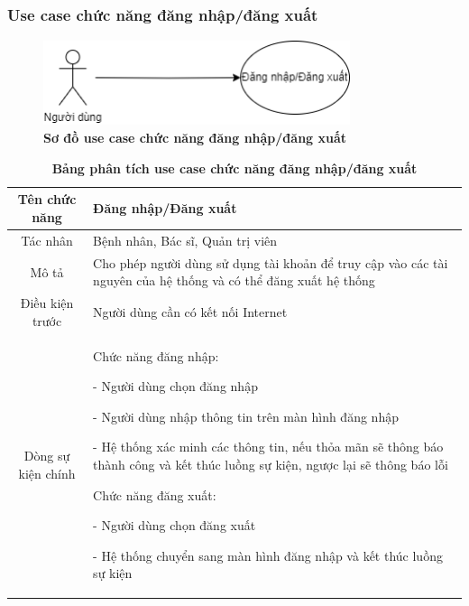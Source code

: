 \subsubsection{Use case chức năng đăng nhập/đăng xuất}
  \begin{figure}[H]
    \centering
    \includegraphics[width=9cm,height=2.5cm]{Images/use_case/use_case_login.png}
    \caption[Sơ đồ use case chức năng đăng nhập/đăng xuất]{\bfseries \fontsize{12pt}{0pt}
    \selectfont Sơ đồ use case chức năng đăng nhập/đăng xuất}
    \label{use_case_login_logout} %
  \end{figure}

  \begin{table}[H]
    \caption{\bfseries \fontsize{12pt}{0pt}\selectfont Bảng phân tích use case chức năng đăng nhập/đăng xuất}
    \centering
    \begin{tabularx}{0.9\textwidth}{|c|X|}
      \hline
      \textbf{Tên chức năng} & \textbf{Đăng nhập/Đăng xuất} \\
      \hline
      Tác nhân & Bệnh nhân, Bác sĩ, Quản trị viên \\
      \hline
      Mô tả & Cho phép người dùng sử dụng tài khoản để truy cập vào các tài nguyên của hệ thống và có thể đăng xuất hệ thống
       \\
      \hline
      Điều kiện trước & Người dùng cần có kết nối Internet \\
      \hline
      Dòng sự kiện chính & 
        Chức năng đăng nhập:

        - Người dùng chọn đăng nhập

        - Người dùng nhập thông tin trên màn hình đăng nhập

        - Hệ thống xác minh các thông tin, nếu thỏa mãn sẽ thông báo thành công và kết thúc luồng sự kiện, ngược lại 
        sẽ thông báo lỗi 

        Chức năng đăng xuất:

        - Người dùng chọn đăng xuất

        - Hệ thống chuyển sang màn hình đăng nhập và kết thúc luồng sự kiện 
        \\
      \hline
    \end{tabularx}
  \end{table}

